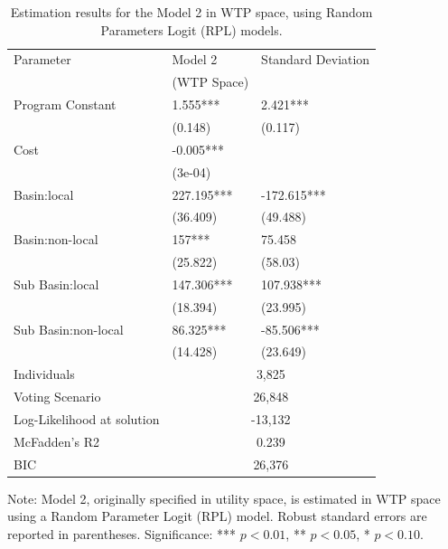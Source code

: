 {
\renewcommand{\thetable}{A1} %
\begin{table}[ht]

\caption{Estimation results for the Model 2 in WTP space, using Random Parameters Logit (RPL) models.}\label{A3.2}

\centering
\begin{tabular}{lll}
  \midrule
Parameter & Model 2 & Standard Deviation \\ 
 & (WTP Space) &  \\ 

  \midrule
Program Constant & 1.555*** & 2.421*** \\ 
   & (0.148) & (0.117) \\ 
  Cost & -0.005*** &  \\ 
   & (3e-04) &  \\ 
  Basin:local & 227.195*** & -172.615*** \\ 
   & (36.409) & (49.488) \\ 
  Basin:non-local & 157*** & 75.458 \\ 
   & (25.822) & (58.03) \\ 
  Sub Basin:local & 147.306*** & 107.938*** \\ 
   & (18.394) & (23.995) \\ 
  Sub Basin:non-local & 86.325*** & -85.506*** \\ 
   & (14.428) & (23.649) \\ 
\midrule

Individuals & \multicolumn{2}{c}{3,825}  \\ 
Voting Scenario & \multicolumn{2}{c}{26,848}  \\  
Log-Likelihood at solution & \multicolumn{2}{c}{-13,132}  \\  
McFadden’s R2 & \multicolumn{2}{c}{0.239}  \\  
BIC & \multicolumn{2}{c}{26,376}  \\  
   \midrule
\end{tabular}

\begin{minipage}{12cm}
   \footnotesize
Note: Model 2, originally specified in utility space, is estimated in WTP space using a Random Parameter Logit 
(RPL) model. Robust standard errors are reported in parentheses. Significance: *** $p < 0.01$, ** $p < 0.05$, * $p < 0.10$.
\end{minipage}



\end{table}
}